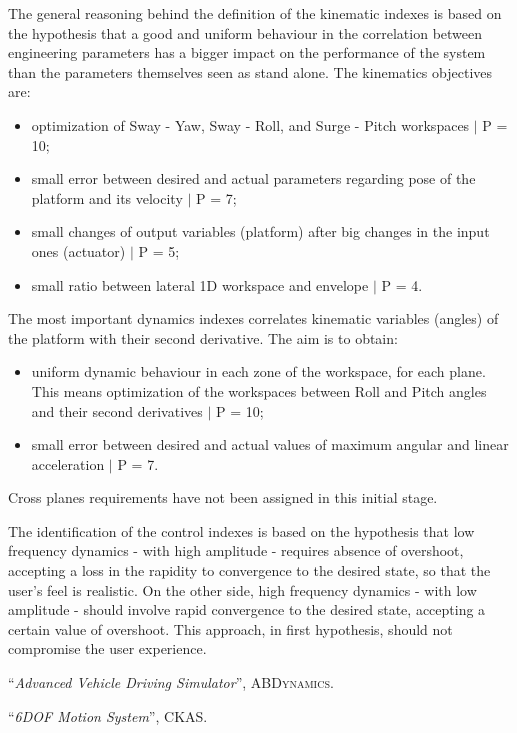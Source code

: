 \documentclass[10.5pt, twocolumn]{article}
\newcommand{\Virgolette}[1]{``#1''}
\begin{document}
The general reasoning behind the definition of the kinematic indexes is based on the hypothesis that a good and uniform behaviour in the correlation between engineering parameters has a bigger impact on the performance of the system than the parameters themselves seen as stand alone.
The kinematics objectives are:
\begin{itemize}
	\item optimization of Sway - Yaw, Sway - Roll, and Surge - Pitch workspaces $\mid$ P = 10;
	\item small error between desired and actual parameters regarding pose of the platform and its velocity $\mid$ P = 7;
	\item small changes of output variables (platform) after big changes in the input ones (actuator) $\mid$ P = 5;
	\item small ratio between lateral 1D workspace and envelope $\mid$ P = 4.
\end{itemize}

The most important dynamics indexes correlates kinematic variables (angles) of the platform with their second derivative.
The aim is to obtain:
\begin{itemize}
	\item uniform dynamic behaviour in each zone of the workspace, for each plane. This means optimization of the workspaces between Roll and Pitch angles and their second derivatives $\mid$ P = 10;
	\item small error between desired and actual values of maximum angular and linear acceleration $\mid$ P = 7.
\end{itemize}
Cross planes requirements have not been assigned in this initial stage.

The identification of the control indexes is based on the hypothesis that low frequency dynamics - with high amplitude - requires absence of overshoot, accepting a loss in the rapidity to convergence to the desired state, so that the user's feel is realistic.
On the other side, high frequency dynamics - with low amplitude - should involve rapid convergence to the desired state, accepting a certain value of overshoot.
This approach, in first hypothesis, should not compromise the user experience.

\begin{thebibliography}{}
\Virgolette{\textit{Advanced Vehicle Driving Simulator}}, \textsc{ABDynamics}.

\Virgolette{\textit{6DOF Motion System}}, \textsc{CKAS}.

\end{thebibliography}
\end{document}
